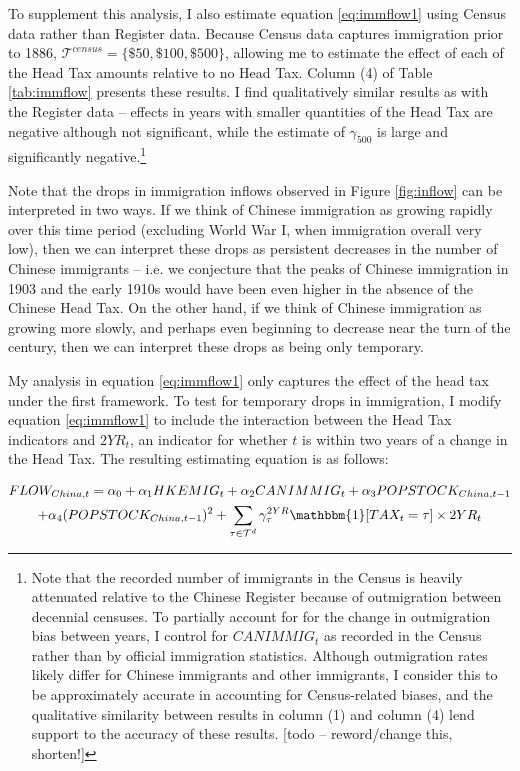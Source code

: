 To supplement this analysis, I also estimate equation \ref{eq:immflow1} using Census data rather than Register data. Because Census data captures immigration prior to 1886, $\mathcal{T}^{census} = \{\$50,\$100,\$500\}$, allowing me to estimate the effect of each of the Head Tax amounts relative to no Head Tax. Column (4) of Table \ref{tab:immflow} presents these results. 
I find qualitatively similar results as with the Register data -- effects in years with smaller quantities of the Head Tax are negative although not significant, while the estimate of $\gamma_{500}$ is large and significantly negative.\footnote{Note that the recorded number of immigrants in the Census is heavily attenuated relative to the Chinese Register because of outmigration between decennial censuses. 
To partially account for for the change in outmigration bias between years, I control for $CANIMMIG_t$ as recorded in the Census rather than by official immigration statistics. Although outmigration rates likely differ for Chinese immigrants and other immigrants, I consider this to be approximately accurate in accounting for Census-related biases, and the qualitative similarity between results in column (1) and column (4) lend support to the accuracy of these results. [todo -- reword/change this, shorten!]}

Note that the drops in immigration inflows observed in Figure \ref{fig:inflow} can be interpreted in two ways. If we think of Chinese immigration as growing rapidly over this time period (excluding World War I, when immigration overall very low), then we can interpret these drops as persistent decreases in the number of Chinese immigrants -- i.e. we conjecture that the peaks of Chinese immigration in 1903 and the early 1910s would have been even higher in the absence of the Chinese Head Tax. On the other hand, if we think of Chinese immigration as growing more slowly, and perhaps even beginning to decrease near the turn of the century, then we can interpret these drops as being only temporary.

My analysis in equation \ref{eq:immflow1} only captures the effect of the head tax under the first framework. To test for temporary drops in immigration, I modify equation \ref{eq:immflow1} to include the interaction between the Head Tax indicators and $2YR_t$, an indicator for whether $t$ is within two years of a change in the Head Tax. The resulting estimating equation is as follows: 

\begin{multline}
    \label{eq:immflow2}
    FLOW_{China,t} = \alpha_0 + \alpha_1 HKEMIG_t + \alpha_2 CANIMMIG_t + \alpha_3 POPSTOCK_{China, t-1} \\ + \alpha_4 (POPSTOCK_{China, t-1})^2 + \sum_{\tau \in \mathcal{T}^d} \gamma^{2YR}_\tau \mathbbm{1}[TAX_t = \tau]\times 2YR_t
\end{multline}

